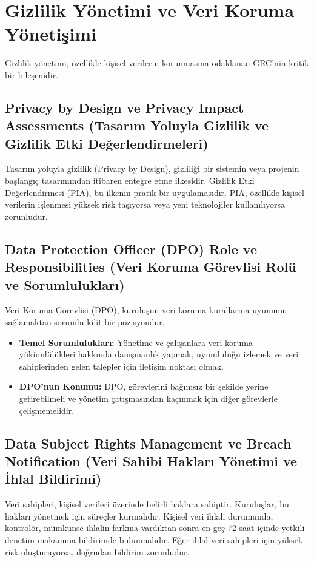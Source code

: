 \section{Gizlilik Yönetimi ve Veri Koruma Yönetişimi}

Gizlilik yönetimi, özellikle kişisel verilerin korunmasına odaklanan GRC'nin kritik bir bileşenidir.

\subsection{Privacy by Design ve Privacy Impact Assessments (Tasarım Yoluyla Gizlilik ve Gizlilik Etki Değerlendirmeleri)}

Tasarım yoluyla gizlilik (Privacy by Design), gizliliği bir sistemin veya projenin başlangıç tasarımından itibaren entegre etme ilkesidir. Gizlilik Etki Değerlendirmesi (PIA), bu ilkenin pratik bir uygulamasıdır. PIA, özellikle kişisel verilerin işlenmesi yüksek risk taşıyorsa veya yeni teknolojiler kullanılıyorsa zorunludur.

\subsection{Data Protection Officer (DPO) Role ve Responsibilities (Veri Koruma Görevlisi Rolü ve Sorumlulukları)}

Veri Koruma Görevlisi (DPO), kuruluşun veri koruma kurallarına uyumunu sağlamaktan sorumlu kilit bir pozisyondur.
\begin{itemize}
    \item \textbf{Temel Sorumlulukları:} Yönetime ve çalışanlara veri koruma yükümlülükleri hakkında danışmanlık yapmak, uyumluluğu izlemek ve veri sahiplerinden gelen talepler için iletişim noktası olmak.
    \item \textbf{DPO'nun Konumu:} DPO, görevlerini bağımsız bir şekilde yerine getirebilmeli ve yönetim çatışmasından kaçınmak için diğer görevlerle çelişmemelidir.
\end{itemize}

\subsection{Data Subject Rights Management ve Breach Notification (Veri Sahibi Hakları Yönetimi ve İhlal Bildirimi)}

Veri sahipleri, kişisel verileri üzerinde belirli haklara sahiptir. Kuruluşlar, bu hakları yönetmek için süreçler kurmalıdır. Kişisel veri ihlali durumunda, kontrolör, mümkünse ihlalin farkına vardıktan sonra en geç 72 saat içinde yetkili denetim makamına bildirimde bulunmalıdır. Eğer ihlal veri sahipleri için yüksek risk oluşturuyorsa, doğrudan bildirim zorunludur.

